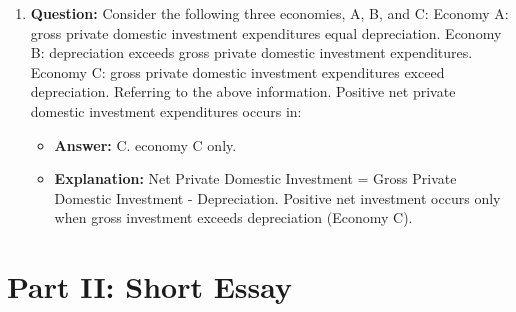 \documentclass{article}
\begin{document}
\begin{enumerate}[label=\arabic*.]
  \item \textbf{Question:} Consider the following three economies, A, B, and C: Economy A: gross private domestic investment expenditures equal depreciation. Economy B: depreciation exceeds gross private domestic investment expenditures. Economy C: gross private domestic investment expenditures exceed depreciation. Referring to the above information. Positive net private domestic investment expenditures occurs in:
    \begin{itemize}
      \item \textbf{Answer:} C. economy C only.
      \item \textbf{Explanation:} Net Private Domestic Investment = Gross Private Domestic Investment - Depreciation. Positive net investment occurs only when gross investment exceeds depreciation (Economy C).
    \end{itemize}
\end{enumerate}

\section*{Part II: Short Essay}
\end{document}
